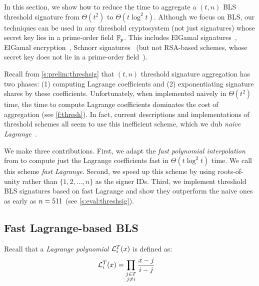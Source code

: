 In this section, we show how to reduce the time to aggregate a $(t,n)$ BLS threshold signature from $\Theta(t^2)$ to $\Theta(t\log^2{t})$.
Although we focus on BLS, our techniques can be used in any threshold cryptosystem (not just signatures) whose secret key lies in a prime-order field $\mathbb{F}_p$.
This includes ElGamal signatures~\cite{Harn94,PK96,GJKR96}, ElGamal encryption~\cite{DF90}, Schnorr signatures~\cite{SS01,GJKR03} (but not RSA-based schemes, whose secret key does not lie in a prime-order field~\cite{Shoup00}).

Recall from \cref{s:prelim:threshsig} that $(t,n)$ threshold signature aggregation has two phases: (1) computing Lagrange coefficients and (2) exponentiating signature shares by these coefficients.
Unfortunately, when implemented naively in $\Theta(t^2)$ time, the time to compute Lagrange coefficients dominates the cost of aggregation (see \cref{f:thresh}).
In fact, current descriptions and implementations of threshold schemes all seem to use this inefficient scheme, which we dub \textit{naive Lagrange}~\cite{bls-chia-impl,bls-dfinity-impl,bls-herumi-impl,bls-sbft-impl,Boldyreva03}.

We make three contributions.
First, we adapt the \textit{fast polynomial interpolation} from \cite{vG13ModernCh10} to compute just the Lagrange coefficients fast in $\Theta(t\log^2{t})$ time.
We call this scheme \textit{fast Lagrange}.
Second, we speed up this scheme by using roots-of-unity rather than $\{1,2,\dots, n\}$ as the signer IDs.
Third, we implement threshold BLS signatures based on fast Lagrange and show they outperform the naive ones as early as $n=511$ (see \cref{s:eval:threshsig}).

\subsection{Fast Lagrange-based BLS}
\label{s:threshsig:fast-lagr}
Recall that a \textit{Lagrange polynomial} $\mathcal{L}_i^T(x)$ is defined as:
\begin{align}
\mathcal{L}_i^T(x) &= \prod_{\substack{j\in T\\j\ne i}}\frac{x-j}{i-j}
\end{align}

